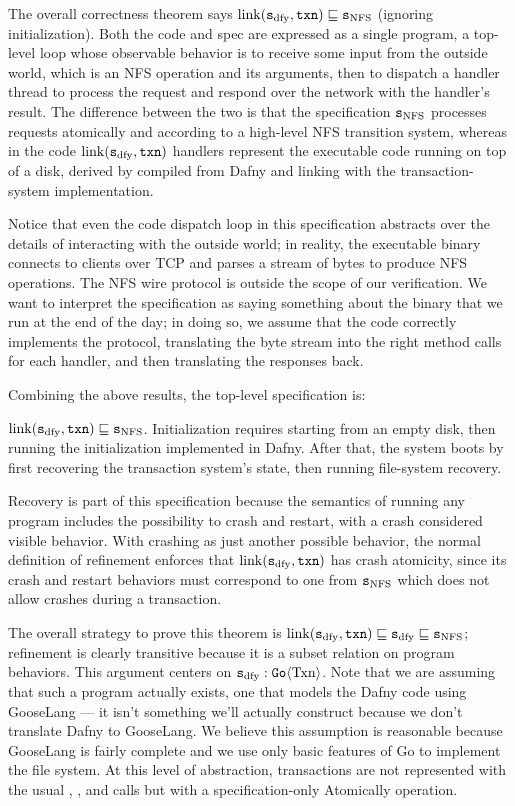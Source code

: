 The overall correctness theorem says
$\mathrm{link}(\texttt{s}_{\mathrm{dfy}}, \texttt{txn}) \sqsubseteq \texttt{s}_{\mathrm{NFS}}$ (ignoring initialization). Both the code and spec
are expressed as a single program, a top-level loop whose
observable behavior is to receive some input from the outside world, which is an
NFS operation and its arguments, then to dispatch a handler thread to process
the request and respond over the network with the handler's result. The
difference between the two is that the specification $\texttt{s}_{\mathrm{NFS}}$ processes requests
atomically and according to a high-level NFS transition system, whereas in the
code $\mathrm{link}(\texttt{s}_{\mathrm{dfy}}, \texttt{txn})$ handlers represent the executable code running on top of a
disk, derived by compiled from Dafny and linking with the transaction-system
implementation.

Notice that even the code dispatch loop in this specification abstracts over the
details of interacting with the outside world; in reality, the executable binary connects
to clients over TCP and parses a stream of bytes to produce NFS operations. The
NFS wire protocol is outside the scope of our verification. We want to
interpret the specification as saying something about the binary that we run at
the end of the day; in doing so, we assume that the code correctly implements
the protocol, translating the byte stream into the right method calls for each
handler, and then translating the responses back.

Combining the above results, the top-level specification is:

\begin{theorem}
  $\mathrm{link}(\texttt{s}_{\mathrm{dfy}}, \texttt{txn}) \sqsubseteq \texttt{s}_{\mathrm{NFS}}$. Initialization requires
  starting from an empty disk, then running the initialization implemented in
  Dafny. After that, the system boots by first recovering the transaction
  system's state, then running file-system recovery.
  \label{thm:correctness-appendix}
\end{theorem}

Recovery is part of this specification because the semantics of running any
program includes the possibility to crash and restart, with a crash considered
visible behavior. With crashing as just another possible behavior, the normal
definition of refinement enforces that $\mathrm{link}(\texttt{s}_{\mathrm{dfy}}, \texttt{txn})$ has crash atomicity, since
its crash and restart behaviors must correspond to one from $\texttt{s}_{\mathrm{NFS}}$ which does
not allow crashes during a transaction.

The overall strategy to prove this theorem is
$\mathrm{link}(\texttt{s}_{\mathrm{dfy}}, \texttt{txn}) \sqsubseteq \texttt{s}_{\mathrm{dfy}} \sqsubseteq \texttt{s}_{\mathrm{NFS}}$; refinement is clearly transitive
because it is a subset relation on program behaviors. This argument
centers on $\texttt{s}_{\mathrm{dfy}} : \mathtt{Go}\langle \mathrm{Txn} \rangle$. Note that we are assuming that
such a program actually exists, one that models the Dafny code using GooseLang
--- it isn't something we'll actually construct because we don't translate Dafny
to GooseLang. We believe this assumption is reasonable because GooseLang is
fairly complete and we use only basic features of Go to implement the file
system. At this level of abstraction, transactions are not represented with the
usual , , and  calls but with a
specification-only Atomically operation.

